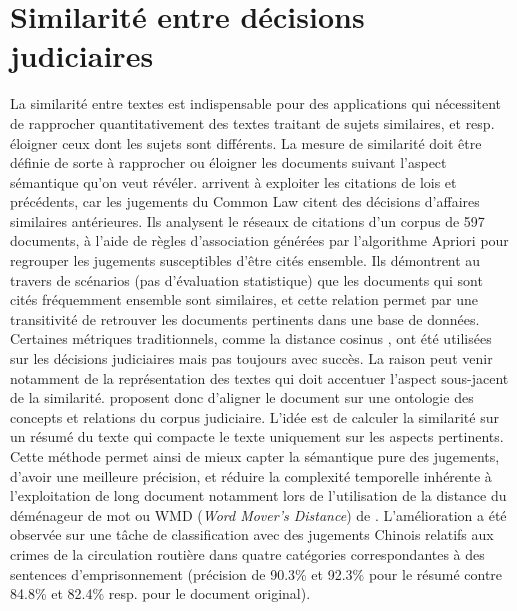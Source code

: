 \section{Similarité entre décisions judiciaires}

La similarité entre textes est indispensable pour des applications qui nécessitent de rapprocher quantitativement des textes traitant de sujets similaires, et resp. éloigner ceux dont les sujets sont différents. La  mesure de similarité doit être définie de sorte à rapprocher ou éloigner les documents suivant l'aspect sémantique qu'on veut révéler. \citet{nair2018judgsimassorule} arrivent à exploiter les citations de lois et précédents, car les jugements du \og Common Law \fg{} citent des décisions d'affaires similaires antérieures. Ils analysent le réseaux de citations d'un corpus de 597 documents, à l'aide de règles d'association générées par l'algorithme Apriori pour regrouper les jugements susceptibles d'être cités ensemble. Ils démontrent au travers de scénarios (pas d'évaluation statistique) que les documents qui sont cités fréquemment ensemble sont similaires, et cette relation permet par une transitivité de retrouver les documents pertinents dans une base de données. Certaines métriques traditionnels, comme la distance cosinus \citep{thenmozhi2017legalprecedretriev}, ont été utilisées sur les décisions judiciaires mais pas toujours avec succès. La raison peut venir notamment de la représentation des textes qui doit accentuer l'aspect sous-jacent de la similarité. \citet{ma2018wmdchinesecase} proposent donc d'aligner le document sur une ontologie des concepts et relations du corpus judiciaire. L'idée est de calculer la similarité sur un résumé du texte qui compacte le texte uniquement sur les aspects pertinents. Cette méthode permet ainsi de mieux capter la sémantique pure des jugements, d'avoir une meilleure précision, et réduire la complexité temporelle inhérente à l'exploitation de long document notamment lors de l'utilisation de la \og distance du déménageur de mot \fg{} ou WMD (\textit{Word Mover's Distance}) de \citet{kusner2015wordmoverdist}. L'amélioration a été observée sur une tâche de classification avec des jugements Chinois relatifs aux crimes de la circulation routière dans quatre catégories correspondantes à des sentences d'emprisonnement (précision de 90.3\% et 92.3\% pour le résumé contre 84.8\% et 82.4\% resp. pour le document original). 

